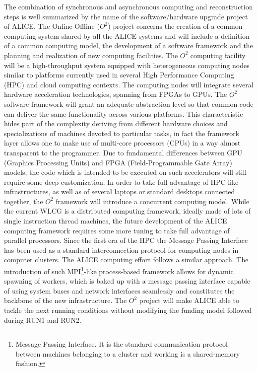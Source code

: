 The combination of synchronous and asynchronous computing and reconstruction steps is well summarized by the name of the software/hardware upgrade project of ALICE.
The Online Offline ($O^2$) project concerns the creation of a common computing system shared by all the ALICE systems and will include a definition of a common computing model, the development of a software framework and the planning and realization of new computing facilities.
The $O^2$ computing facility will be a high-throughput system equipped with heterogeneous computing nodes similar to platforms currently used in several High Performance Computing (HPC) and cloud computing contexts.
The computing nodes will integrate several hardware acceleration technologies, spanning from FPGAs to GPUs.
The $O^2$ software framework will grant an adequate abstraction level so that common code can deliver the same functionality across various platforms.
This characteristic hides part of the complexity deriving from different hardware choices and specializations of machines devoted to particular tasks, in fact the framework layer allows one to make use of multi-core processors (CPUs) in a way almost transparent to the programmer.
Due to fundamental differences between GPU (Graphics Processing Units) and FPGA (Field-Programmable Gate Array) models, the code which is intended to be executed on such accelerators will still require some deep customization.
In order to take full advantage of HPC-like infrastructures, as well as of several laptops or standard desktops connected together, the $O^2$ framework will introduce a concurrent computing model.
While the current WLCG is a distributed computing framework, ideally made of lots of single instruction thread machines, the future development of the ALICE computing framework requires some more tuning to take full advantage of parallel processors.
Since the first era of the HPC the Message Passing Interface has been used as a standard interconnection protocol for computing nodes in computer clusters.
The ALICE computing effort follows a similar approach.
The introduction of such MPI\footnote{Message Passing Interface. It is the standard communication protocol between machines belonging to a cluster and working is a shared-memory fashion.}-like process-based framework allows for dynamic spawning of workers, which is baked up with a message passing interface capable of using system buses and network interfaces seamlessly and constitutes the backbone of the new infrastructure.
The $O^2$ project will make ALICE able to tackle the next running conditions without modifying the funding model followed during RUN1 and RUN2.

